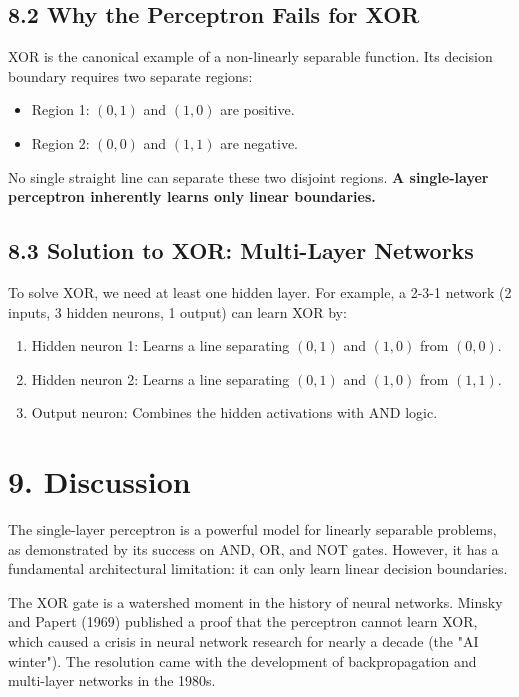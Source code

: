 \documentclass[11pt]{article}
\begin{document}
\subsection*{8.2 Why the Perceptron Fails for XOR}
XOR is the canonical example of a non-linearly separable function. Its decision boundary requires two separate regions:
\begin{itemize}
\item Region 1: $(0,1)$ and $(1,0)$ are positive.
\item Region 2: $(0,0)$ and $(1,1)$ are negative.
\end{itemize}
No single straight line can separate these two disjoint regions. \textbf{A single-layer perceptron inherently learns only linear boundaries.}

\subsection*{8.3 Solution to XOR: Multi-Layer Networks}
To solve XOR, we need at least one hidden layer. For example, a 2-3-1 network (2 inputs, 3 hidden neurons, 1 output) can learn XOR by:
\begin{enumerate}
\item Hidden neuron 1: Learns a line separating $(0,1)$ and $(1,0)$ from $(0,0)$.
\item Hidden neuron 2: Learns a line separating $(0,1)$ and $(1,0)$ from $(1,1)$.
\item Output neuron: Combines the hidden activations with AND logic.
\end{enumerate}

\section*{9. Discussion}

The single-layer perceptron is a powerful model for linearly separable problems, as demonstrated by its success on AND, OR, and NOT gates. However, it has a fundamental architectural limitation: it can only learn linear decision boundaries.

The XOR gate is a watershed moment in the history of neural networks. Minsky and Papert (1969) published a proof that the perceptron cannot learn XOR, which caused a crisis in neural network research for nearly a decade (the "AI winter"). The resolution came with the development of backpropagation and multi-layer networks in the 1980s.
\end{document}
